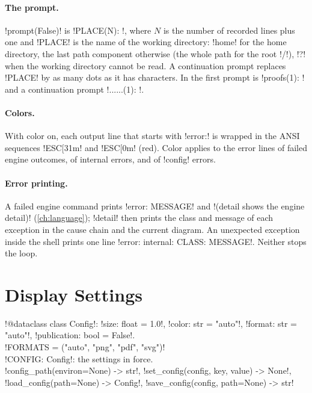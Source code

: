 \paragraph{The prompt.} \py!prompt(False)! is \code!PLACE(N): !, where $N$ is the number of recorded lines plus one and \code!PLACE! is the name of the working directory: \code!home! for the home directory, the last path component otherwise (the whole path for the root \code!/!), \code!?! when the working directory cannot be read. A continuation prompt replaces \code!PLACE! by as many dots as it has characters. In  the first prompt is \code!proofs(1): ! and a continuation prompt \code!......(1): !.

\paragraph{Colors.} With color on, each output line that starts with \code!error:! is wrapped in the ANSI sequences \code!ESC[31m! and \code!ESC[0m! (red). Color applies to the error lines of failed engine outcomes, of internal errors, and of \azx!config! errors.

\paragraph{Error printing.} A failed engine command prints \code!error: MESSAGE! and \code!(detail shows the engine detail)! (\cref{ch:language}); \azx!detail! then prints the class and message of each exception in the cause chain and the current diagram. An unexpected exception inside the shell prints one line \code!error: internal: CLASS: MESSAGE!. Neither stops the loop.

\section{Display Settings}\label{sec:shell-config}

\begin{signature}
\py!@dataclass class Config!: \py!size: float = 1.0!, \code!color: str = "auto"!, \code!format: str = "auto"!, \py!publication: bool = False!.\\
\code!FORMATS = ("auto", "png", "pdf", "svg")!\\
\py!CONFIG: Config!: the settings in force.\\
\py!config_path(environ=None) -> str!, \py!set_config(config, key, value) -> None!, \py!load_config(path=None) -> Config!, \py!save_config(config, path=None) -> str!
\end{signature}

